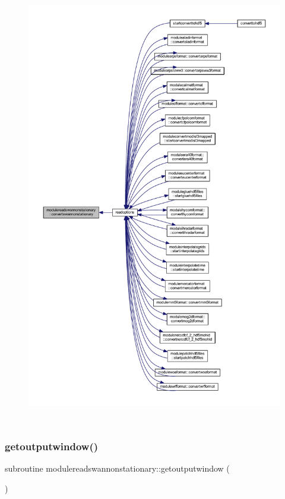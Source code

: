 \begin{figure}[H]
\begin{center}
\leavevmode
\includegraphics[height=550pt]{namespacemodulereadswannonstationary_adb8e6556bbf5f51e70fbc7c10af87a70_icgraph}
\end{center}
\end{figure}
\mbox{\label{namespacemodulereadswannonstationary_a7fdb18d8cbff6e60af51a911dbea6813}} 
\subsubsection{\texorpdfstring{getoutputwindow()}{getoutputwindow()}}
{\footnotesize\ttfamily subroutine modulereadswannonstationary\+::getoutputwindow (\begin{DoxyParamCaption}{ }\end{DoxyParamCaption})\hspace{0.3cm}{\ttfamily [private]}}

